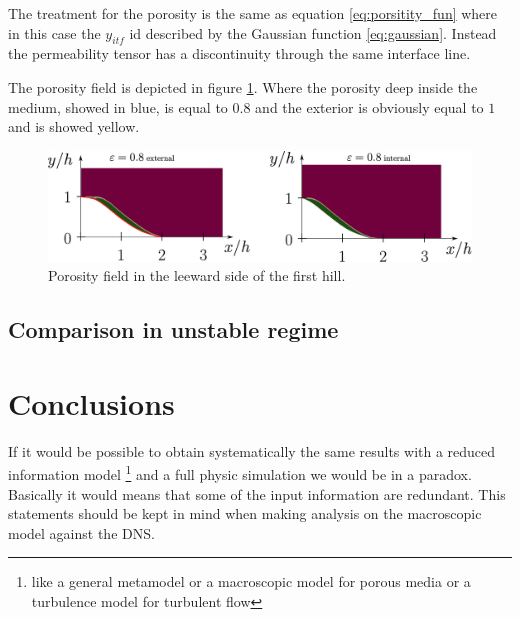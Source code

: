 The treatment for the porosity is the same as equation \eqref{eq:porsitity_fun} where in this case the $y_{itf}$ id described by the Gaussian function \eqref{eq:gaussian}.
Instead the permeability tensor has a discontinuity through the same interface line.

The porosity field is depicted in figure \ref{fig:por_gauss}. Where the porosity deep inside the medium, showed in blue, is equal to $0.8$ and the exterior is obviously equal to $1$ and is showed yellow.

\begin{figure}[h]
\centering
\includegraphics[width=0.7\linewidth]{chapter_5/figure/por}
\caption{Porosity field in the leeward side of the first hill.}
\label{fig:por_gauss}
\end{figure}





\subsection{Comparison in unstable regime}



\section{Conclusions}

If it would be possible to obtain systematically the same results with a reduced information model \footnote{like a general metamodel or a macroscopic model for porous media or a turbulence model for turbulent flow} and a full physic simulation we would be in a paradox. Basically it would means that some of the input information are redundant. This statements should be kept in mind when making analysis on the macroscopic model against the DNS.



